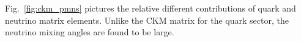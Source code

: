 Fig.~\ref{fig:ckm_pmns} pictures the relative different contributions of quark and neutrino matrix elements.
Unlike the CKM matrix for the quark sector, the neutrino mixing angles are found to be large.
